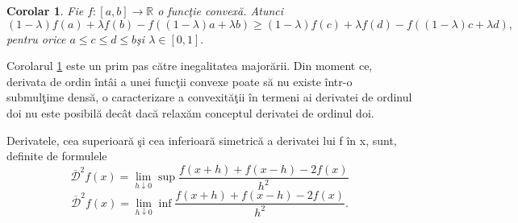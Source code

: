 \documentclass[a4paper,12pt,oneside]{report}
\newtheorem{corollary}{Corolar}
\begin{document}
\begin{corollary} \label{Corolar 3} 
Fie \(f : \left [ a,b \right ] \rightarrow \mathbb{R}\) o func\c{t}ie convex\u{a}. Atunci 
\begin{displaymath}
   \left ( 1-\lambda  \right )f\left ( a \right ) + \lambda f\left ( b \right ) - f\left ( \left ( 1-\lambda  \right )a + \lambda b \right )\geq \left ( 1-\lambda  \right )f\left ( c \right )+\lambda f\left ( d \right ) - f\left ( \left ( 1 -\lambda \right )c + \lambda d \right ), 
\end{displaymath}
pentru orice \(a\leq c\leq d\leq b \)\c{s}i \(\lambda \in \left [ 0,1 \right ].\) 
\end{corollary}
Corolarul \ref{Corolar 3} este un prim pas c\u{a}tre inegalitatea major\u{a}rii. Din moment ce, derivata de ordin \^{i}nt\^{a}i a unei func\c{t}ii convexe poate s\u{a} nu existe  \^{i}ntr-o submul\c{t}ime dens\u{a}, o caracterizare a convexit\u{a}\c{t}ii \^{i}n termeni ai derivatei de ordinul doi nu este posibil\u{a} dec\^{a}t dac\u{a} relax\u{a}m conceptul derivatei de ordinul doi. 

Derivatele, cea superioar\u{a} \c{s}i cea inferioar\u{a} simetric\u{a} a derivatei lui f \^{i}n x, sunt, definite de formulele
\begin{displaymath}
   \overline{ \mathcal{D}}^{2}f\left ( x \right ) = \lim_{h\downarrow0} \sup\frac{f\left ( x+h \right ) + f\left ( x-h \right ) -2f\left ( x \right )}{h^{2}}
\end{displaymath}
\begin{displaymath}
   \overline{ \mathcal{D}}^{2}f\left ( x \right ) = \lim_{h\downarrow0} \inf\frac{f\left ( x+h \right ) + f\left ( x-h \right ) -2f\left ( x \right )}{h^{2}}.
\end{displaymath}
\end{document}
